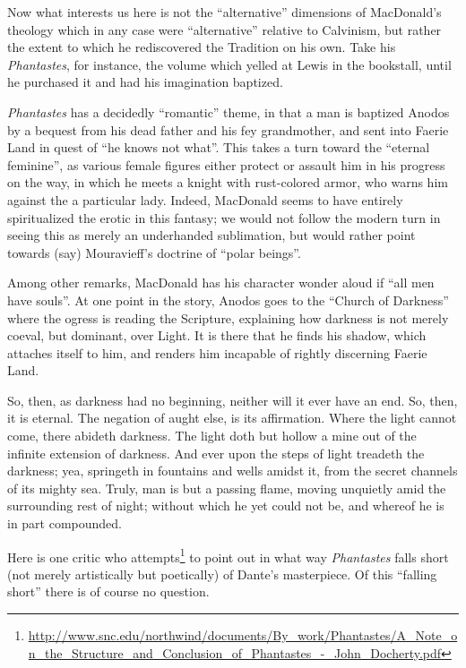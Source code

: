 Now what interests us here is not the ``alternative'' dimensions of MacDonald's theology which in any case were ``alternative'' relative to Calvinism, but rather the extent to which he rediscovered the Tradition on his own. Take his \emph{Phantastes}, for instance, the volume which yelled at Lewis in the bookstall, until he purchased it and had his imagination baptized.

\emph{Phantastes} has a decidedly ``romantic'' theme, in that a man is baptized Anodos by a bequest from his dead father and his fey grandmother, and sent into Faerie Land in quest of ``he knows not what''. This takes a turn toward the ``eternal feminine'', as various female figures either protect or assault him in his progress on the way, in which he meets a knight with rust-colored armor, who warns him against the a particular lady. Indeed, MacDonald seems to have entirely spiritualized the erotic in this fantasy; we would not follow the modern turn in seeing this as merely an underhanded sublimation, but would rather point towards (say) Mouravieff's doctrine of ``polar beings''.

Among other remarks, MacDonald has his character wonder aloud if ``all men have souls''. At one point in the story, Anodos goes to the ``Church of Darkness'' where the ogress is reading the Scripture, explaining how darkness is not merely coeval, but dominant, over Light. It is there that he finds his shadow, which attaches itself to him, and renders him incapable of rightly discerning Faerie Land.

\begin{quotex}

So, then, as darkness had no beginning, neither will it ever have an end. So, then, it is eternal. The negation of aught else, is its affirmation. Where the light cannot come, there abideth darkness. The light doth but hollow a mine out of the infinite extension of darkness. And ever upon the steps of light treadeth the darkness; yea, springeth in fountains and wells amidst it, from the secret channels of its mighty sea. Truly, man is but a passing flame, moving unquietly amid the surrounding rest of night; without which he yet could not be, and whereof he is in part compounded.

\end{quotex}


Here is one critic who attempts\footnote{\url{http://www.snc.edu/northwind/documents/By\_work/Phantastes/A\_Note\_on\_the\_Structure\_and\_Conclusion\_of\_Phantastes\_-\_John\_Docherty.pdf}} to point out in what way \emph{Phantastes} falls short (not merely artistically but poetically) of Dante's masterpiece. Of this ``falling short'' there is of course no question.

